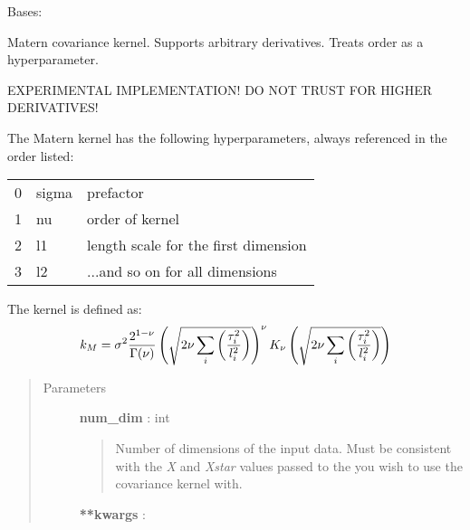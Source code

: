 \documentclass[letterpaper,10pt,english]{sphinxmanual}
\begin{document}
\begin{fulllineitems}
\label{gptools.kernel:gptools.kernel.matern.MaternKernel}
Bases: {\hyperref[gptools.kernel:gptools.kernel.core.ChainRuleKernel]{}}

Matern covariance kernel. Supports arbitrary derivatives. Treats order as a hyperparameter.

EXPERIMENTAL IMPLEMENTATION! DO NOT TRUST FOR HIGHER DERIVATIVES!

The Matern kernel has the following hyperparameters, always referenced in
the order listed:

\begin{tabulary}{\linewidth}{|L|L|L|}
\hline

0
 & 
sigma
 & 
prefactor
\\

1
 & 
nu
 & 
order of kernel
\\

2
 & 
l1
 & 
length scale for the first dimension
\\

3
 & 
l2
 & 
...and so on for all dimensions
\\
\hline\end{tabulary}


The kernel is defined as:
\begin{gather}
\begin{split}k_M = \sigma^2 \frac{2^{1-\nu}}{\Gamma(\nu)}
\left (\sqrt{2\nu \sum_i\left (\frac{\tau_i^2}{l_i^2}\right )}\right )^\nu
K_\nu\left(\sqrt{2\nu \sum_i\left(\frac{\tau_i^2}{l_i^2}\right)}\right)\end{split}\notag
\end{gather}\begin{quote}\begin{description}
\item[{Parameters}] \leavevmode
\textbf{num\_dim} : int
\begin{quote}

Number of dimensions of the input data. Must be consistent with the \emph{X}
and \emph{Xstar} values passed to the {\hyperref[gptools:gptools.gaussian_process.GaussianProcess]{}}
you wish to use the covariance kernel with.
\end{quote}

\textbf{**kwargs} :
\begin{quote}


\end{quote}
\end{description}
\end{quote}
\end{fulllineitems}
\end{document}
